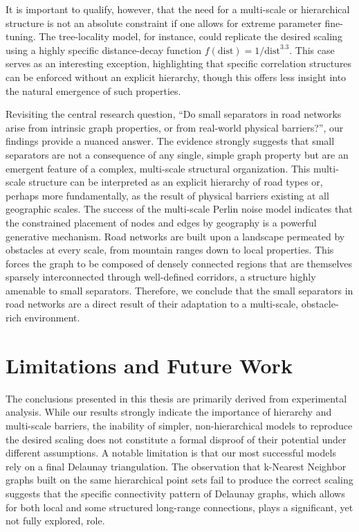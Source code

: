 It is important to qualify, however, that the need for a multi-scale or hierarchical structure is not an absolute constraint if one allows for extreme parameter fine-tuning.
The tree-locality model, for instance, could replicate the desired scaling using a highly specific distance-decay function \(f(\text{dist}) = 1/\text{dist}^{3.3}\).
This case serves as an interesting exception, highlighting that specific correlation structures can be enforced without an explicit hierarchy, though this offers less insight into the natural emergence of such properties.

Revisiting the central research question, \enquote{Do small separators in road networks arise from intrinsic graph properties, or from real-world physical barriers?}, our findings provide a nuanced answer.
The evidence strongly suggests that small separators are not a consequence of any single, simple graph property but are an emergent feature of a complex, multi-scale structural organization.
This multi-scale structure can be interpreted as an explicit hierarchy of road types or, perhaps more fundamentally, as the result of physical barriers existing at all geographic scales.
The success of the multi-scale Perlin noise model indicates that the constrained placement of nodes and edges by geography is a powerful generative mechanism.
Road networks are built upon a landscape permeated by obstacles at every scale, from mountain ranges down to local properties.
This forces the graph to be composed of densely connected regions that are themselves sparsely interconnected through well-defined corridors, a structure highly amenable to small separators.
Therefore, we conclude that the small separators in road networks are a direct result of their adaptation to a multi-scale, obstacle-rich environment.

\section{Limitations and Future Work}
\label{sec:conclusion:future_work}

The conclusions presented in this thesis are primarily derived from experimental analysis.
While our results strongly indicate the importance of hierarchy and multi-scale barriers, the inability of simpler, non-hierarchical models to reproduce the desired scaling does not constitute a formal disproof of their potential under different assumptions.
A notable limitation is that our most successful models rely on a final Delaunay triangulation.
The observation that k-Nearest Neighbor graphs built on the same hierarchical point sets fail to produce the correct scaling suggests that the specific connectivity pattern of Delaunay graphs, which allows for both local and some structured long-range connections, plays a significant, yet not fully explored, role.


